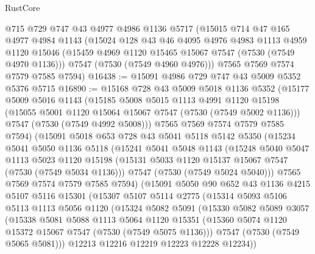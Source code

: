 \begin{lexlean}{RustCore}
\begin{coremodule}
    @715
    @729
    @747
    @43
    @4977
    @4986
    @1136
    @5717
    (@15015
      @714
      @47
      @165
      @4977
      @4984
      @1143
      (@15024
        @128
        @43
        @46
        @4095
        @4976
        @4983
        @1113
        @4959
        @1120
        @15046
        (@15459 @4969 @1120 @15465 @15067 @7547 (@7530 (@7549 @4970 @1136)))
        @7547
        (@7530 (@7549 @4960 @4976)))
      @7565
      @7569
      @7574
      @7579
      @7585
      @7594)
@16438 := @15091 @4986 @729 @747 @43 @5009 @5352 @5376 @5715
@16890 := @15168
    @728
    @43
    @5009
    @5018
    @1136
    @5352
    (@15177
      @5009
      @5016
      @1143
      (@15185
        @5008
        @5015
        @1113
        @4991
        @1120
        @15198
        (@15055 @5001 @1120 @15064 @15067 @7547 (@7530 (@7549 @5002 @1136)))
        @7547
        (@7530 (@7549 @4992 @5008)))
      @7565
      @7569
      @7574
      @7579
      @7585
      @7594)
    (@15091
      @5018
      @653
      @728
      @43
      @5041
      @5118
      @5142
      @5350
      (@15234
        @5041
        @5050
        @1136
        @5118
        (@15241
          @5041
          @5048
          @1143
          (@15248
            @5040
            @5047
            @1113
            @5023
            @1120
            @15198
            (@15131 @5033 @1120 @15137 @15067 @7547 (@7530 (@7549 @5034 @1136)))
            @7547
            (@7530 (@7549 @5024 @5040)))
          @7565
          @7569
          @7574
          @7579
          @7585
          @7594)
        (@15091
          @5050
          @90
          @652
          @43
          @1136
          @4215
          @5107
          @5116
          @15301
          (@15307
            @5107
            @5114
            @2775
            (@15314
              @5093
              @5106
              @5113
              @1113
              @5056
              @1120
              (@15324
                @5082
                @5091
                (@15330
                  @5082
                  @5089
                  @3057
                  (@15338
                    @5081
                    @5088
                    @1113
                    @5064
                    @1120
                    @15351
                    (@15360 @5074 @1120 @15372 @15067 @7547 (@7530 (@7549 @5075 @1136)))
                    @7547
                    (@7530 (@7549 @5065 @5081)))
                  @12213
                  @12216
                  @12219
                  @12223
                  @12228
                  @12234))

\end{coremodule}
\end{lexlean}
